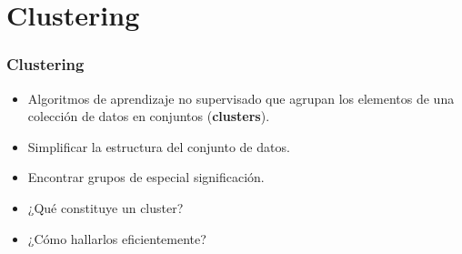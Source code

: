 \section{Clustering}\label{sec:clustering}

\begin{frame}
    \frametitle{Clustering}

    \begin{itemize}
        \item<1-> Algoritmos de aprendizaje no supervisado que agrupan los elementos de una colección de datos en conjuntos (\textbf{clusters}).
        \item<2-> Simplificar la estructura del conjunto de datos.
        \item<3-> Encontrar grupos de especial significación.
    \end{itemize}

    \begin{itemize}
        \item<3-> ¿Qué constituye un cluster?
        \item<4-> ¿Cómo hallarlos eficientemente?
    \end{itemize}

\end{frame}

